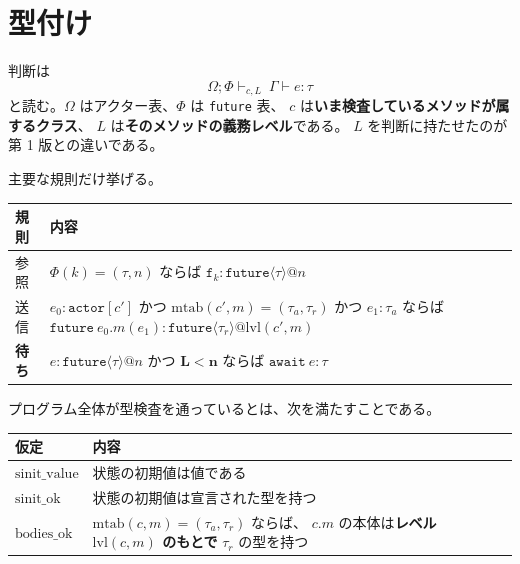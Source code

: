 \documentclass[11pt,a4paper]{ltjsarticle}
\makeatletter
\theoremstyle{definition}
\theoremstyle{remark}
\newcommand{\tact}[1]{\ensuremath{\mathtt{actor}[#1]}}
\newcommand{\Om}{\Omega}
\newcommand{\Ph}{\Phi}
\newcommand{\mtab}{\mathrm{mtab}}
\newcommand{\tfutl}[2]{\ensuremath{\mathtt{future}\langle #1 \rangle @ #2}}
\newcommand{\lvl}{\mathrm{lvl}}
\makeatother
\begin{document}
\section{型付け}
\label{sec:typing}

判断は
\[
\Om;\Ph \vdash_{c,L}\ \Gamma \vdash e : \tau
\]
と読む。$\Om$ はアクター表、$\Ph$ は \texttt{future} 表、
$c$ は\textbf{いま検査しているメソッドが属するクラス}、
$L$ は\textbf{そのメソッドの義務レベル}である。
$L$ を判断に持たせたのが第 1 版との違いである。

主要な規則だけ挙げる。

\begin{center}
\small
\begin{tabular}{@{}lp{9.0cm}@{}}
\toprule
規則 & 内容 \\
\midrule
参照 & $\Ph(k) = (\tau, n)$ ならば $\mathtt{f}_k : \tfutl{\tau}{n}$ \\
\addlinespace
送信 & $e_0 : \tact{c'}$ かつ $\mtab(c',m) = (\tau_a,\tau_r)$ かつ $e_1 : \tau_a$
  ならば\newline
  $\mathtt{future}\ e_0.m(e_1) : \tfutl{\tau_r}{\lvl(c',m)}$ \\
\addlinespace
\textbf{待ち} & $e : \tfutl{\tau}{n}$ かつ $\boldsymbol{L < n}$ ならば
  $\mathtt{await}\ e : \tau$ \\
\bottomrule
\end{tabular}
\end{center}

\begin{center}
\end{center}

プログラム全体が型検査を通っているとは、次を満たすことである。

\begin{center}
\small
\begin{tabular}{@{}lp{8.4cm}@{}}
\toprule
仮定 & 内容 \\
\midrule
$\mathrm{sinit\_value}$ & 状態の初期値は値である \\
$\mathrm{sinit\_ok}$ & 状態の初期値は宣言された型を持つ \\
$\mathrm{bodies\_ok}$ & $\mtab(c,m) = (\tau_a,\tau_r)$ ならば、
  $c.m$ の本体は\textbf{レベル $\lvl(c,m)$ のもとで} $\tau_r$ の型を持つ \\
\bottomrule
\end{tabular}
\end{center}
\end{document}
